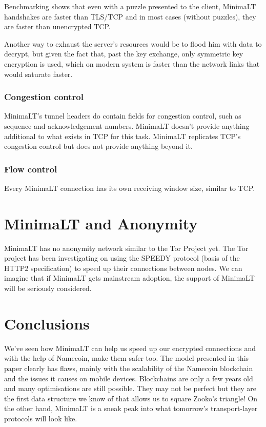 \documentclass{vldb}
\begin{document}
Benchmarking shows that even with a puzzle presented to the client, MinimaLT handshakes are faster than TLS/TCP and in most cases (without puzzles), they are faster than unencrypted TCP.\cite{MinimaLT}

Another way to exhaust the server's resources would be to flood him with data to decrypt, but given the fact that, past the key exchange, only symmetric key encryption is used, which on modern system is faster than the network links that would saturate faster.

\subsubsection{Congestion control}

MinimaLT's tunnel headers do contain fields for congestion control, such as sequence and acknowledgement numbers. MinimaLT doesn't provide anything additional to what exists in TCP for this task. MinimaLT replicates TCP's congestion control but does not provide anything beyond it.

\subsubsection{Flow control}

Every MinimaLT connection has its own receiving window size, similar to TCP. 

\section{MinimaLT and Anonymity}

MinimaLT has no anonymity network similar to the Tor Project yet. The Tor project has been investigating on using the SPEEDY protocol (basis of the HTTP2 specification) to speed up their connections between nodes. We can imagine that if MinimaLT gets mainstream adoption, the support of MinimaLT will be seriously considered.

\section{Conclusions}

We've seen how MinimaLT can help us speed up our encrypted connections and with the help of Namecoin, make them safer too. The model presented in this paper clearly has flaws, mainly with the scalability of the Namecoin blockchain and the issues it causes on mobile devices. Blockchains are only a few years old and many optimisations are still possible. They may not be perfect but they are the first data structure we know of that allows us to square Zooko's triangle! On the other hand, MinimaLT is a sneak peak into what tomorrow's transport-layer protocols will look like.
\end{document}
